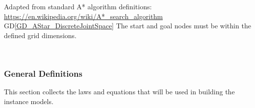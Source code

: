 \documentclass[12pt]{article}
\newcommand{\dref}[1]{GD\ref{#1}}
\begin{document}
{
Adapted from standard A* algorithm definitions:\\
\url{https://en.wikipedia.org/wiki/A*_search_algorithm}
}
{
  \dref{GD_AStar_DiscreteJointSpace}
}
{
The start and goal nodes must be within the defined grid dimensions.
}
{}



~\newline

\subsubsection{General Definitions}\label{sec_gendef}

This section collects the laws and equations that will be used in building the instance models.

~\newline
\end{document}
